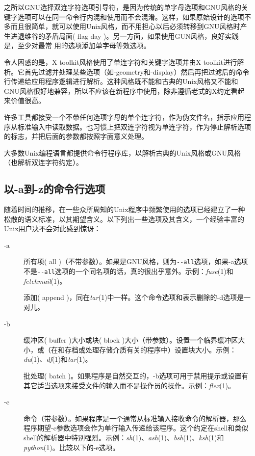 \documentclass[12pt,oneside]{book}
\begin{document}
\begin{common-format}
之所以GNU选择双连字符选项引导符，是因为传统的单字母选项和GNU风格的关键字选项可以在同一命令行内混和使用而不会混淆。这样，如果原始设计的选项不多而且很简单，就可以使用Unix风格，而不用担心以后必须转移到GNU风格时产生进退维谷的矛盾局面( flag day )。另一方面，如果使用GUN风格，良好实践是，至少对最常
用的选项添加单字母等效选项。

令人困惑的是，X toolkit风格使用了单连字符和关键字选项并由X toolkit进行解析。它首先过滤并处理某些选项（如-geometry和-display）然后再把过滤后的命令行传递给应用程序逻辑进行解析。这种风格既不能和古典的Unix风格又不能和GNU风格很好地兼容，所以不应该在新程序中使用，除非遵循老式的X约定看起来价值很高。

许多工具都接受一个不带任何选项字母的单个连字符，作为伪文件名，指示应用程序从标准输入中读取数据。也习惯上把双连字符视为单连字符，作为停止解析选项的标志，并把后面的参数都按照字面意义处理。

大多数Unix编程语言都提供命令行程序库，以解析古典的Unix风格或GNU风格（也解析双连字符约定）。

\subsection{以-a到-z的命令行选项}
随着时间的推移，在一些众所周知的Unix程序中频繁使用的选项已经建立了一种松散的语义标准，以其期望含义。以下列出一些选项及其含义，一个经验丰富的Unix用户决不会对此感到惊讶：
\begin{description}
\item[-a] 所有项( all )（不带参数）。如果是GNU风格，则为\verb+--all+选项，如果-a选项不是\verb+--all+选项的一个同名项的话，真的很出乎意外。示例：\textit{fuse}(1)和\textit{fetchmail}(1)。

添加( append )，同在\textit{tar}(1)中一样。这个命令选项和表示删除的-d选项是一对儿。
\item[-b] 缓冲区( buffer )大小或块( block )大小（带参数）。设置一个临界缓冲区大小，或（在和存档或处理存储介质有关的程序中）设置块大小。示例：\textit{du}(1)、\textit{df}(1)和\textit{tar}(1)。

批处理( batch )。如果程序是自然交互的，-b选项可用于禁用提示或设置有其它适当选项来接受文件的输入而不是操作员的操作。示例：\textit{flex}(1)。
\item[-c] 命令（带参数）。如果程序是一个通常从标准输入接收命令的解析器，那么程序期望-c参数选项会作为单行输入传递给该程序。这个约定在shell和类似shell的解析器中特别强烈。示例：\textit{sh}(1)、\textit{ash}(1)、\textit{bsh}(1)、\textit{ksh}(1)和\textit{python}(1)。比较以下的-e选项。


\end{description}
\end{common-format}
\end{document}
